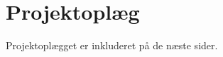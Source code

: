 \documentclass[rapport.tex]{subfiles}
\begin{document}
\chapter{Projektoplæg}\label{app:projektoplaeg}
Projektoplægget er inkluderet på de næste sider.
\end{document}
